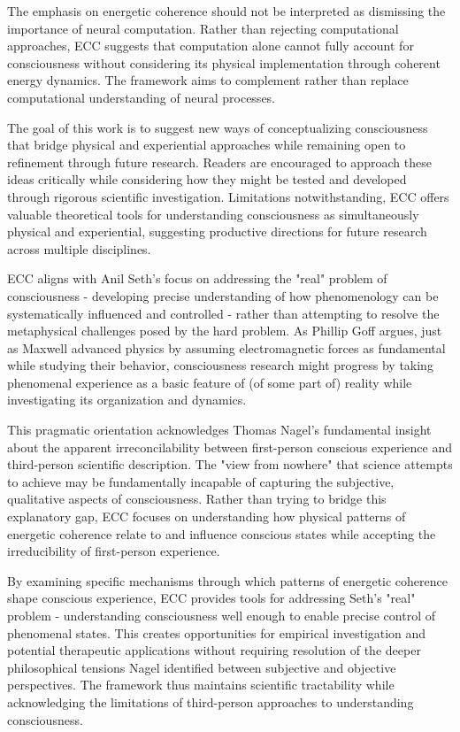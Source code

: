The emphasis on energetic coherence should not be interpreted as dismissing the importance of neural computation. Rather than rejecting computational approaches, ECC suggests that computation alone cannot fully account for consciousness without considering its physical implementation through coherent energy dynamics. The framework aims to complement rather than replace computational understanding of neural processes.

The goal of this work is to suggest new ways of conceptualizing consciousness that bridge physical and experiential approaches while remaining open to refinement through future research. Readers are encouraged to approach these ideas critically while considering how they might be tested and developed through rigorous scientific investigation. Limitations notwithstanding, ECC offers valuable theoretical tools for understanding consciousness as simultaneously physical and experiential, suggesting productive directions for future research across multiple disciplines.

ECC aligns with Anil Seth's focus on addressing the "real" problem of consciousness - developing precise understanding of how phenomenology can be systematically influenced and controlled - rather than attempting to resolve the metaphysical challenges posed by the hard problem. As Phillip Goff argues, just as Maxwell advanced physics by assuming electromagnetic forces as fundamental while studying their behavior, consciousness research might progress by taking phenomenal experience as a basic feature of (of some part of) reality while investigating its organization and dynamics.

This pragmatic orientation acknowledges Thomas Nagel's fundamental insight about the apparent irreconcilability between first-person conscious experience and third-person scientific description. The "view from nowhere" that science attempts to achieve may be fundamentally incapable of capturing the subjective, qualitative aspects of consciousness. Rather than trying to bridge this explanatory gap, ECC focuses on understanding how physical patterns of energetic coherence relate to and influence conscious states while accepting the irreducibility of first-person experience.

By examining specific mechanisms through which patterns of energetic coherence shape conscious experience, ECC provides tools for addressing Seth's "real" problem - understanding consciousness well enough to enable precise control of phenomenal states. This creates opportunities for empirical investigation and potential therapeutic applications without requiring resolution of the deeper philosophical tensions Nagel identified between subjective and objective perspectives. The framework thus maintains scientific tractability while acknowledging the limitations of third-person approaches to understanding consciousness.

